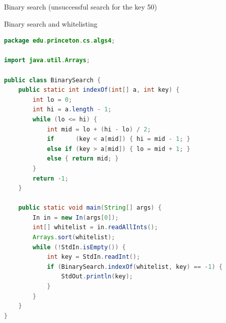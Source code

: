 \documentclass[8pt,a4paper,compress]{beamer}
\begin{document}
\begin{frame}[fragile]
\pause

Binary search (unsuccessful search for the key 50)
\begin{center}
\end{center}
\end{frame}

\begin{frame}[fragile]
\pause

Binary search and whitelisting

\smallskip

\begin{lstlisting}[language=Java,style=focusin]
package edu.princeton.cs.algs4;

import java.util.Arrays;

public class BinarySearch {
    public static int indexOf(int[] a, int key) {
        int lo = 0;
        int hi = a.length - 1;
        while (lo <= hi) {
            int mid = lo + (hi - lo) / 2;
            if      (key < a[mid]) { hi = mid - 1; }
            else if (key > a[mid]) { lo = mid + 1; }
            else { return mid; }
        }
        return -1;
    }

    public static void main(String[] args) {
        In in = new In(args[0]);
        int[] whitelist = in.readAllInts();
        Arrays.sort(whitelist);
        while (!StdIn.isEmpty()) {
            int key = StdIn.readInt();
            if (BinarySearch.indexOf(whitelist, key) == -1) {
                StdOut.println(key);
            }
        }
    }
}
\end{lstlisting}
\end{frame}
\end{document}
